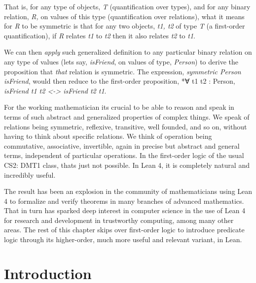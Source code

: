 \documentclass{book}
\begin{document}
That is, for any type of objects, \emph{T} (quantification over types), and for any binary relation, \emph{R,} on values of this type (quantification over relations), what it means for \emph{R} to be symmetric is that for any two objects, \emph{t1, t2}
of type \emph{T} (a first-order quantification), if \emph{R} relates \emph{t1} to \emph{t2} then it also relates \emph{t2} to \emph{t1}.

We can then \emph{apply} such generalized definition to any particular binary relation on any type of values (let\textquotesingle s say, \emph{isFriend}, on values of type, \emph{Person}) to derive the proposition that \emph{that} relation is symmetric. The expression, \emph{symmetric Person isFriend}, would then reduce to the first-order proposition, *∀ t1 t2 : Person, \emph{isFriend t1 t2 \textless{}-\textgreater{}  isFriend t2 t1}.

For the working mathematician it\textquotesingle s crucial to be able to reason and speak in terms of such abstract and generalized properties of complex things. We speak of relations being symmetric, reflexive, transitive, well founded, and so on, without having to think about specific relations. We think of operation being commutative, associative, invertible, again in precise but abstract and general terms, independent of particular operations. In the first-order logic of the usual CS2: DMT1 class, that\textquotesingle s just not possible. In Lean 4, it is completely natural and incredibly useful.

The result has been an explosion in the community of mathematicians using Lean 4 to formalize and verify theorems in many branches of advanced mathematics. That in turn has sparked deep interest in computer science in the use of Lean 4 for research and development in trustworthy computing, among many other areas. The rest of this chapter skips over first-order logic to introduce predicate logic through its higher-order, much more useful and relevant variant, in Lean.

\hypertarget{book__pandoc__debug__src__dmt1__lectures__l07_predicatelogic__00_introduction.lean.md}{}
\hypertarget{book__pandoc__debug__src__dmt1__lectures__l07_predicatelogic__00_introduction.lean.md__introduction}{%
\section{Introduction}\label{book__pandoc__debug__src__dmt1__lectures__l07_predicatelogic__00_introduction.lean.md__introduction}}
\end{document}
